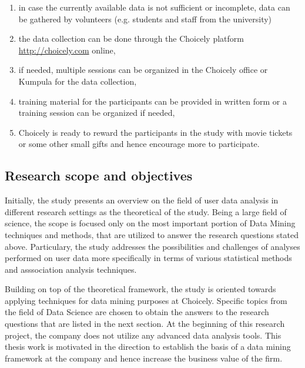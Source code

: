     \begin{enumerate}
        \item in case the currently available data is not sufficient or incomplete, data can be gathered by volunteers (e.g. students and staff from the university)
        \item the data collection can be done through the Choicely platform \url{http://choicely.com} online,
        \item if needed, multiple sessions can be organized in the Choicely office or Kumpula for the data collection,
        \item training material for the participants can be provided in written form or a training session can be organized if needed,  
        \item Choicely is ready to reward the participants in the study with movie tickets or some other small gifts and hence encourage more to participate.
    \end{enumerate}

\subsection{Research scope and objectives}
    Initially, the study presents an overview on the field of user data analysis in different research settings as the theoretical of the study. Being a large field of science, the scope is focused only on the most important portion of Data Mining techniques and methods, that are utilized to answer the research questions stated above. Particulary, the study addresses the possibilities and challenges of analyses performed on user data more specifically in terms of various statistical methods and asssociation analysis techniques.    

    Building on top of the theoretical framework, the study is oriented towards applying techniques for data mining purposes at Choicely. Specific topics from the field of Data Science are chosen to obtain the answers to the research questions that are listed in the next section. At the beginning of this research project, the company does not utilize any advanced data analysis tools. This thesis work is motivated in the direction to establish the basis of a data mining framework at the company and hence increase the business value of the firm.  

